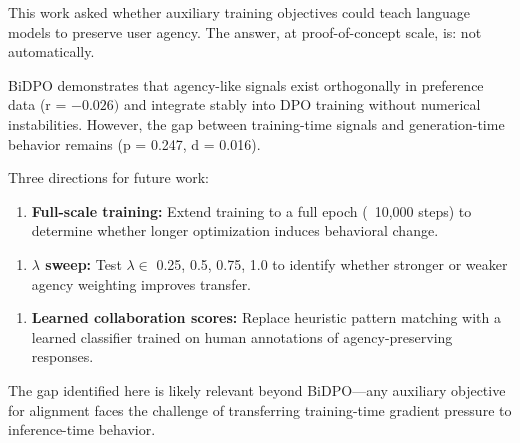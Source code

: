 
This work asked whether auxiliary training objectives could teach language models to preserve user agency. The answer, at proof-of-concept scale, is: not automatically.

BiDPO demonstrates that agency-like signals exist orthogonally in preference data (r = $-0.026)$ and integrate stably into DPO training without numerical instabilities. However, the gap between training-time signals and generation-time behavior remains (p = 0.247, d = 0.016).

Three directions for future work:

\begin{enumerate}
\item \textbf{Full-scale training:} Extend training to a full epoch (~10,000 steps) to determine whether longer optimization induces behavioral change.
\end{enumerate}

\begin{enumerate}
\item \textbf{$\lambda$ sweep:} Test $\lambda \in$ {0.25, 0.5, 0.75, 1.0} to identify whether stronger or weaker agency weighting improves transfer.
\end{enumerate}

\begin{enumerate}
\item \textbf{Learned collaboration scores:} Replace heuristic pattern matching with a learned classifier trained on human annotations of agency-preserving responses.
\end{enumerate}

The gap identified here is likely relevant beyond BiDPO---any auxiliary objective for alignment faces the challenge of transferring training-time gradient pressure to inference-time behavior.

